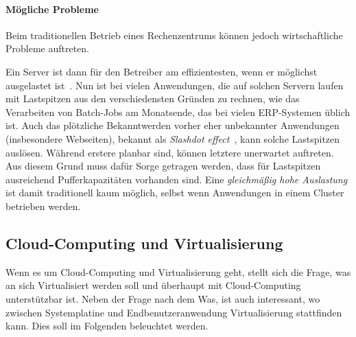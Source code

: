 \paragraph*{Mögliche Probleme}
\label{sec:mogliche-probleme}


Beim traditionellen Betrieb eines Rechenzentrums können jedoch
wirtschaftliche Probleme auftreten. 

Ein Server ist dann für den Betreiber am effizientesten, wenn er
möglichst ausgelastet ist~\cite{Schwarzer2010:Cloud-Hype-Tren}. Nun
ist bei vielen Anwendungen, die auf solchen Servern laufen mit
Lastspitzen aus den verschiedensten Gründen zu rechnen, wie das
Verarbeiten von Batch-Jobs am Monatsende, das bei vielen
\ac{ERP}-Systemen üblich ist. Auch das plötzliche Bekanntwerden vorher
eher unbekannter Anwendungen (insbesondere Webseiten), bekannt als
\emph{Slashdot effect}~\cite{halavais2001slashdot}, kann solche
Lastspitzen auslösen. Während erstere planbar sind, können letztere
unerwartet auftreten. Aus diesem Grund muss dafür Sorge getragen
werden, dass für Lastspitzen ausreichend Pufferkapazitäten vorhanden
sind. Eine \emph{gleichmäßig hohe Auslastung} ist damit traditionell
kaum möglich, selbst wenn Anwendungen in einem Cluster betrieben
werden.






\subsection{Cloud-Computing und Virtualisierung}
\label{sec:ziel}


Wenn es um Cloud-Computing und Virtualisierung geht, stellt sich die
Frage, was an sich Virtualisiert werden soll und überhaupt mit
Cloud-Computing unterstützbar ist. Neben der Frage nach dem Was, ist
auch interessant, wo zwischen Systemplatine und Endbenutzeranwendung
Virtualisierung stattfinden kann. Dies soll im Folgenden beleuchtet werden.



